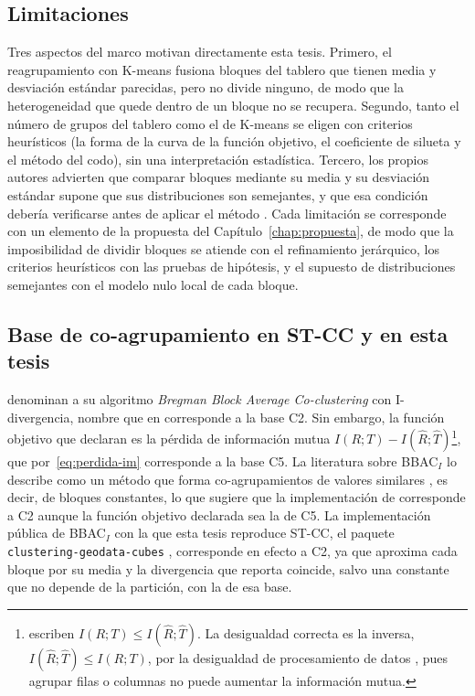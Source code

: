 \subsection{Limitaciones}\label{sec:stcc-limitaciones}

Tres aspectos del marco motivan directamente esta tesis. Primero, el
reagrupamiento con K-means fusiona bloques del tablero que tienen
media y desviación estándar parecidas, pero no divide ninguno, de modo que la
heterogeneidad que quede dentro de un bloque no se recupera. Segundo, tanto el
número de grupos del tablero como el de K-means se eligen con criterios
heurísticos (la forma de la curva de la función objetivo, el coeficiente de
silueta y el método del codo), sin una interpretación estadística. Tercero, los
propios autores advierten que comparar bloques mediante su media y su desviación
estándar supone que sus distribuciones son semejantes, y que esa condición
debería verificarse antes de aplicar el método \citep[Sec.~IV.E]{Liu2021}. Cada
limitación se corresponde con un elemento de la propuesta del
Capítulo~\ref{chap:propuesta}, de modo que la imposibilidad de dividir bloques se
atiende con el refinamiento jerárquico, los criterios heurísticos con las pruebas
de hipótesis, y el supuesto de distribuciones semejantes con el modelo nulo local
de cada bloque.

\subsection{Base de co-agrupamiento en ST-CC y en esta tesis}\label{sec:stcc-base}

\citet{Liu2021} denominan a su algoritmo \emph{Bregman Block Average
Co-clustering} con I-divergencia, nombre que en \citet[Sec.~3]{Banerjee2007}
corresponde a la base C2. Sin embargo, la función objetivo que declaran es la
pérdida de información mutua $I(R;T) - I(\hat{R};\hat{T})$\footnote{\citet{Liu2021}
escriben $I(R;T) \le I(\hat{R};\hat{T})$. La desigualdad correcta es la inversa,
$I(\hat{R};\hat{T}) \le I(R;T)$, por la desigualdad de procesamiento de datos
\citep{Cover2006}, pues agrupar filas o columnas no puede aumentar la información
mutua.}, que por~\eqref{eq:perdida-im} corresponde a la base C5. La literatura
sobre BBAC$_I$ lo describe como un método que forma co-agrupamientos de valores
similares \citep{Wu2020,Wu2022}, es decir, de bloques constantes, lo que sugiere
que la implementación de \citet{Liu2021} corresponde a C2 aunque la función
objetivo declarada sea la de C5. La implementación pública de BBAC$_I$ con la que
esta tesis reproduce ST-CC, el paquete \texttt{clustering-geodata-cubes}
\citep{Nattino2022}, corresponde en efecto a C2, ya que aproxima cada bloque por
su media y la divergencia que reporta coincide, salvo una constante que no
depende de la partición, con la de esa base.

